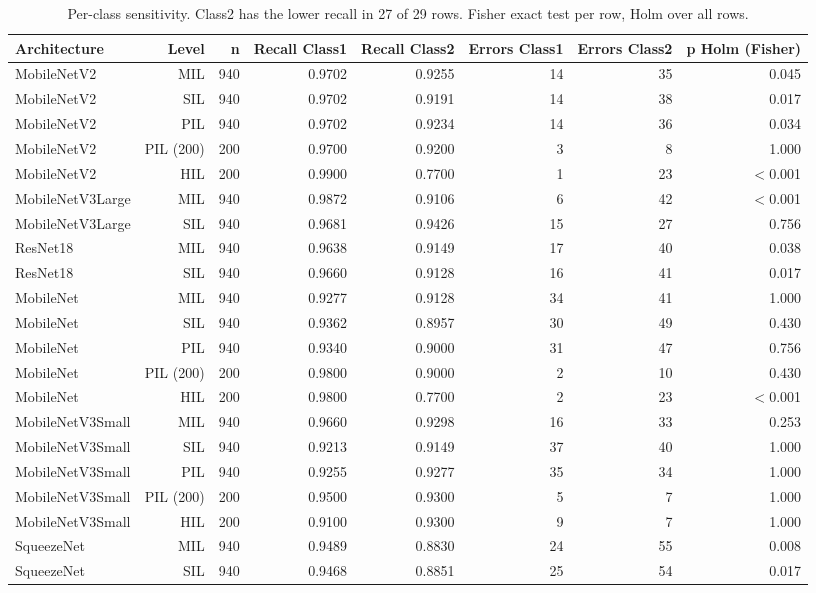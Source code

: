 \begin{table}[htbp]
\centering
\scriptsize
\caption{Per-class sensitivity. Class2 has the lower recall in 27 of 29 rows. Fisher exact test per row, Holm over all rows.}
\label{tab:ladder5}
\begin{tabular}{lrrrrrrr}
\toprule
Architecture & Level & n & Recall Class1 & Recall Class2 & Errors Class1 & Errors Class2 & p Holm (Fisher) \\
\midrule
MobileNetV2 & MIL & 940 & 0.9702 & 0.9255 & 14 & 35 & 0.045 \\
MobileNetV2 & SIL & 940 & 0.9702 & 0.9191 & 14 & 38 & 0.017 \\
MobileNetV2 & PIL & 940 & 0.9702 & 0.9234 & 14 & 36 & 0.034 \\
MobileNetV2 & PIL (200) & 200 & 0.9700 & 0.9200 & 3 & 8 & 1.000 \\
MobileNetV2 & HIL & 200 & 0.9900 & 0.7700 & 1 & 23 & $<$0.001 \\
MobileNetV3Large & MIL & 940 & 0.9872 & 0.9106 & 6 & 42 & $<$0.001 \\
MobileNetV3Large & SIL & 940 & 0.9681 & 0.9426 & 15 & 27 & 0.756 \\
ResNet18 & MIL & 940 & 0.9638 & 0.9149 & 17 & 40 & 0.038 \\
ResNet18 & SIL & 940 & 0.9660 & 0.9128 & 16 & 41 & 0.017 \\
MobileNet & MIL & 940 & 0.9277 & 0.9128 & 34 & 41 & 1.000 \\
MobileNet & SIL & 940 & 0.9362 & 0.8957 & 30 & 49 & 0.430 \\
MobileNet & PIL & 940 & 0.9340 & 0.9000 & 31 & 47 & 0.756 \\
MobileNet & PIL (200) & 200 & 0.9800 & 0.9000 & 2 & 10 & 0.430 \\
MobileNet & HIL & 200 & 0.9800 & 0.7700 & 2 & 23 & $<$0.001 \\
MobileNetV3Small & MIL & 940 & 0.9660 & 0.9298 & 16 & 33 & 0.253 \\
MobileNetV3Small & SIL & 940 & 0.9213 & 0.9149 & 37 & 40 & 1.000 \\
MobileNetV3Small & PIL & 940 & 0.9255 & 0.9277 & 35 & 34 & 1.000 \\
MobileNetV3Small & PIL (200) & 200 & 0.9500 & 0.9300 & 5 & 7 & 1.000 \\
MobileNetV3Small & HIL & 200 & 0.9100 & 0.9300 & 9 & 7 & 1.000 \\
SqueezeNet & MIL & 940 & 0.9489 & 0.8830 & 24 & 55 & 0.008 \\
SqueezeNet & SIL & 940 & 0.9468 & 0.8851 & 25 & 54 & 0.017 \\

\end{tabular}
\end{table}
